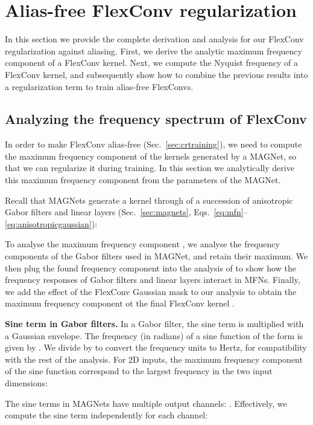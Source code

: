 \documentclass{article} \usepackage{iclr2022_conference,times}
\begin{document}
\section{Alias-free FlexConv regularization}
\label{sec:regularizingflexconv}
In this section we provide the complete derivation and analysis for our FlexConv regularization against aliasing. First, we derive the analytic maximum frequency component of a FlexConv kernel. Next, we compute the Nyquist frequency of a FlexConv kernel, and subsequently show how to combine the previous results into a regularization term to train alias-free FlexConvs.

\subsection{Analyzing the frequency spectrum of FlexConv}
\label{sec:magnetanalysis}

In order to make FlexConv alias-free (Sec.~\ref{sec:crtraining}), we need to compute the maximum frequency component of the kernels generated by a MAGNet, so that we can regularize it during training. In this section we analytically derive this maximum frequency component from the parameters of the MAGNet.

Recall that MAGNets generate a kernel  through of a succession of anisotropic Gabor filters and linear layers (Sec.~\ref{sec:magnets}, Eqs.~\ref{eq:mfn}--\ref{eq:anisotropicgaussian}):



To analyse the maximum frequency component , we analyse the frequency components of the Gabor filters used in MAGNet, and retain their maximum. We then plug the found frequency component into the analysis of \citet{fathony2021multiplicative} to show how the frequency responses of Gabor filters and linear layers interact in MFNs. Finally, we add the effect of the FlexConv Gaussian mask to our analysis to obtain the maximum frequency component ot the final FlexConv kernel .

\textbf{Sine term in Gabor filters.} In a Gabor filter, the sine term is multiplied with a Gaussian envelope. The frequency (in radians) of a sine function of the form  is given by . We divide by  to convert the frequency units to Hertz, for compatibility with the rest of the analysis. For 2D inputs, the maximum frequency component of the sine function correspond to the largest frequency in the two input dimensions:

The sine terms in MAGNets have multiple output channels: . Effectively, we compute the sine term independently for each channel:
\end{document}
